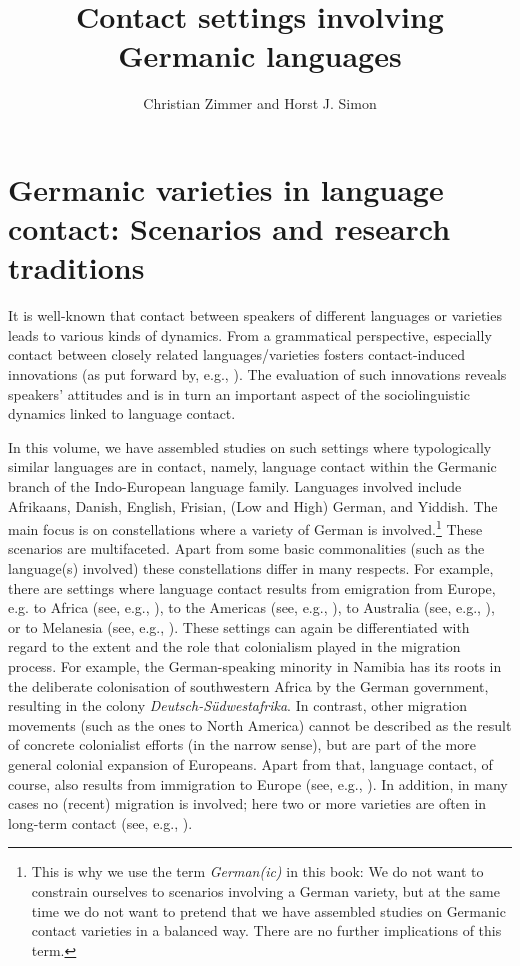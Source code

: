 \documentclass[output=paper]{langsci/langscibook}
\author{Christian Zimmer\affiliation{Freie Universität Berlin} and Horst J. Simon\affiliation{Freie Universität Berlin}}
\title{Contact settings involving Germanic languages}
\begin{document}
\maketitle

\section{Germanic varieties in language contact: Scenarios and research traditions} %
\label{sec:zimmer:1}

It is well-known that contact between speakers of different languages or varieties leads to various kinds of dynamics. From a grammatical perspective, especially contact between closely related languages/varieties fosters contact-induced innovations (as put forward by, e.g., \citealt{thomason_contact-induced_2014}). The evaluation of such innovations reveals speakers’ attitudes and is in turn an important aspect of the sociolinguistic dynamics linked to language contact.

In this volume, we have assembled studies on such settings where typologically similar languages are in contact, namely, language contact within the Germanic branch of the Indo-European language family. Languages involved include Afrikaans, Danish, English, Frisian, (Low and High) German, and Yiddish. The main focus is on constellations where a variety of German is involved.\footnote{This is why we use the term \textit{{German(ic)}} in this book: We do not want to constrain ourselves to scenarios involving a German variety, but at the same time we do not want to pretend that we have assembled studies on Germanic contact varieties in a balanced way. There are no further implications of this term.} These scenarios are multifaceted. Apart from some basic commonalities (such as the language(s) involved) these constellations differ in many respects. For example, there are settings where language contact results from emigration from Europe, e.g. to Africa (see, e.g., \citealt{wiese_german_2017}), to the Americas (see, e.g., \citealt{johannessen_germanic_2015}), to Australia (see, e.g., \citealt{riehl_language_2015}), or to Melanesia (see, e.g., \citealt{maitz_unserdeutsch_nodate}). These settings can again be differentiated with regard to the extent and the role that colonialism played in the migration process. For example, the German-speaking minority in Namibia has its roots in the deliberate colonisation of southwestern Africa by the German government, resulting in the colony \textit{Deutsch-Südwestafrika}. In contrast, other migration movements (such as the ones to North America) cannot be described as the result of concrete colonialist efforts (in the narrow sense), but are part of the more general colonial expansion of Europeans. Apart from that, language contact, of course, also results from immigration to Europe (see, e.g., \citealt{wiese_what_2013}). In addition, in many cases no (recent) migration is involved; here two or more varieties are often in long-term contact (see, e.g., ).
\end{document}
